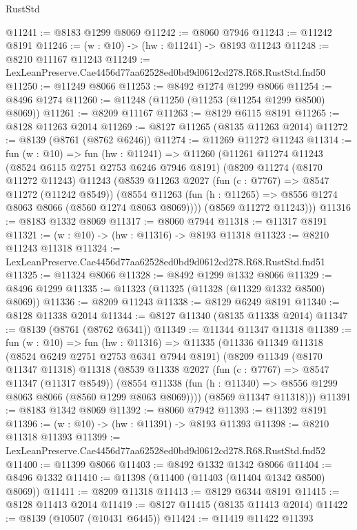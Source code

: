 \begin{lexlean}{RustStd}
\begin{coremodule}
@11241 := @8183 @1299 @8069
@11242 := @8060 @7946
@11243 := @11242 @8191
@11246 := (w : @10) -> (hw : @11241) -> @8193 @11243
@11248 := @8210 @11167 @11243
@11249 := LexLeanPreserve.Cae4456d77aa62528ed0bd9d0612cd278.R68.RustStd.fnd50
@11250 := @11249 @8066
@11253 := @8492 @1274 @1299 @8066
@11254 := @8496 @1274
@11260 := @11248 (@11250 (@11253 (@11254 @1299 @8500) @8069))
@11261 := @8209 @11167
@11263 := @8129 @6115 @8191
@11265 := @8128 @11263 @2014
@11269 := @8127 @11265 (@8135 @11263 @2014)
@11272 := @8139 (@8761 (@8762 @6246))
@11274 := @11269 @11272 @11243
@11314 := fun (w : @10) =>
  fun (hw : @11241) =>
  @11260
    (@11261
      @11274
      @11243
      (@8524 @6115 @2751 @2753 @6246 @7946 @8191)
      (@8209
        @11274
        (@8170 @11272 @11243)
        @11243
        (@8539
          @11263
          @2027
          (fun (c : @7767) => @8547 @11272 (@11242 @8549))
          (@8554 @11263 (fun (h : @11265) => @8556 @1274 @8063 @8066 (@8560 @1274 @8063 @8069))))
        (@8569 @11272 @11243)))
@11316 := @8183 @1332 @8069
@11317 := @8060 @7944
@11318 := @11317 @8191
@11321 := (w : @10) -> (hw : @11316) -> @8193 @11318
@11323 := @8210 @11243 @11318
@11324 := LexLeanPreserve.Cae4456d77aa62528ed0bd9d0612cd278.R68.RustStd.fnd51
@11325 := @11324 @8066
@11328 := @8492 @1299 @1332 @8066
@11329 := @8496 @1299
@11335 := @11323 (@11325 (@11328 (@11329 @1332 @8500) @8069))
@11336 := @8209 @11243
@11338 := @8129 @6249 @8191
@11340 := @8128 @11338 @2014
@11344 := @8127 @11340 (@8135 @11338 @2014)
@11347 := @8139 (@8761 (@8762 @6341))
@11349 := @11344 @11347 @11318
@11389 := fun (w : @10) =>
  fun (hw : @11316) =>
  @11335
    (@11336
      @11349
      @11318
      (@8524 @6249 @2751 @2753 @6341 @7944 @8191)
      (@8209
        @11349
        (@8170 @11347 @11318)
        @11318
        (@8539
          @11338
          @2027
          (fun (c : @7767) => @8547 @11347 (@11317 @8549))
          (@8554 @11338 (fun (h : @11340) => @8556 @1299 @8063 @8066 (@8560 @1299 @8063 @8069))))
        (@8569 @11347 @11318)))
@11391 := @8183 @1342 @8069
@11392 := @8060 @7942
@11393 := @11392 @8191
@11396 := (w : @10) -> (hw : @11391) -> @8193 @11393
@11398 := @8210 @11318 @11393
@11399 := LexLeanPreserve.Cae4456d77aa62528ed0bd9d0612cd278.R68.RustStd.fnd52
@11400 := @11399 @8066
@11403 := @8492 @1332 @1342 @8066
@11404 := @8496 @1332
@11410 := @11398 (@11400 (@11403 (@11404 @1342 @8500) @8069))
@11411 := @8209 @11318
@11413 := @8129 @6344 @8191
@11415 := @8128 @11413 @2014
@11419 := @8127 @11415 (@8135 @11413 @2014)
@11422 := @8139 (@10507 (@10431 @6445))
@11424 := @11419 @11422 @11393

\end{coremodule}
\end{lexlean}
